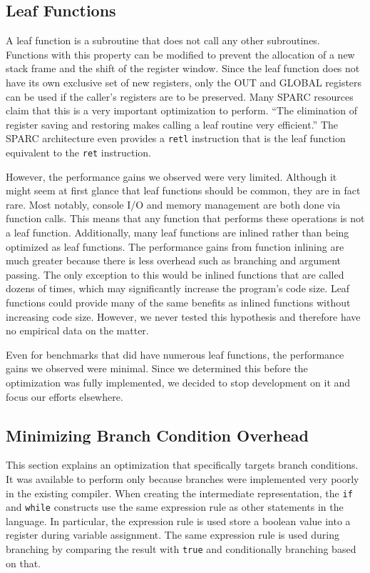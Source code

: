 \documentclass[12pt]{article}
\begin{document}
\subsection{Leaf Functions}
A leaf function is a subroutine that does not call any other subroutines.
Functions with this property can be modified to prevent the allocation of a new stack frame and the shift of the register window.
Since the leaf function does not have its own exclusive set of new registers, only the OUT and GLOBAL registers can be used if the caller's registers are to be preserved.
Many SPARC resources claim that this is a very important optimization to perform.
``The elimination of register saving and restoring makes calling a leaf routine very efficient.'' \cite{sparcArchitecture}
The SPARC architecture even provides a {\tt retl} instruction that is the leaf function equivalent to the {\tt ret} instruction.

However, the performance gains we observed were very limited.
Although it might seem at first glance that leaf functions should be common, they are in fact rare.
Most notably, console I/O and memory management are both done via function calls.
This means that any function that performs these operations is not a leaf function.
Additionally, many leaf functions are inlined rather than being optimized as leaf functions.
The performance gains from function inlining are much greater because there is less overhead such as branching and argument passing.
The only exception to this would be inlined functions that are called dozens of times, which may significantly increase the program's code size.
Leaf functions could provide many of the same benefits as inlined functions without increasing code size.
However, we never tested this hypothesis and therefore have no empirical data on the matter.

Even for benchmarks that did have numerous leaf functions, the performance gains we observed were minimal.
Since we determined this before the optimization was fully implemented, we decided to stop development on it and focus our efforts elsewhere.

\subsection{Minimizing Branch Condition Overhead}
This section explains an optimization that specifically targets branch conditions.
It was available to perform only because branches were implemented very poorly in the existing compiler.
When creating the intermediate representation, the {\tt if} and {\tt while} constructs use the same expression rule as other statements in the language.
In particular, the expression rule is used store a boolean value into a register during variable assignment.
The same expression rule is used during branching by comparing the result with {\tt true} and conditionally branching based on that.
\end{document}
